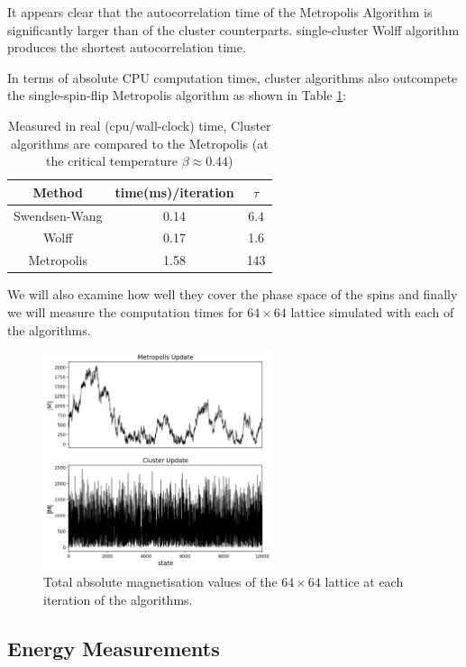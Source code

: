 It appears clear that the autocorrelation time of the Metropolis Algorithm is significantly larger than of the cluster counterparts. single-cluster Wolff algorithm produces the shortest autocorrelation time.

In terms of absolute CPU computation times, cluster algorithms also outcompete the single-spin-flip Metropolis algorithm as shown in Table \ref{tab:methods}:

\begin{table}[h!]
	\centering
	\begin{tabular}{|c |c |c|}
		\hline
		\textbf{Method} & \textbf{time(ms)/iteration}	 &\textbf{$\tau$}\\
		\hline
		Swendsen-Wang 	& 0.14 	& 6.4\\
		\hline
		Wolff		& 0.17	& 1.6\\
		\hline
		Metropolis & 1.58	& 143\\
		\hline	
	\end{tabular}
	\caption{Measured in real (cpu/wall-clock) time, Cluster algorithms are compared to the Metropolis (at the critical temperature $\beta \approx 0.44$)}
	\label{tab:methods}
\end{table}

We will also examine how well they cover the phase space of the spins and finally we will measure the computation times for $64 \times 64$ lattice simulated with each of the algorithms.

\begin{figure}[h!]
  \label{fig:config}
  \includegraphics[width=0.6\textwidth]{figures/configs_compare.png}
  \centering
  \caption{Total absolute magnetisation values of the $64 \times 64$ lattice at each iteration of the algorithms. }
\end{figure}

\subsection{Energy Measurements}

